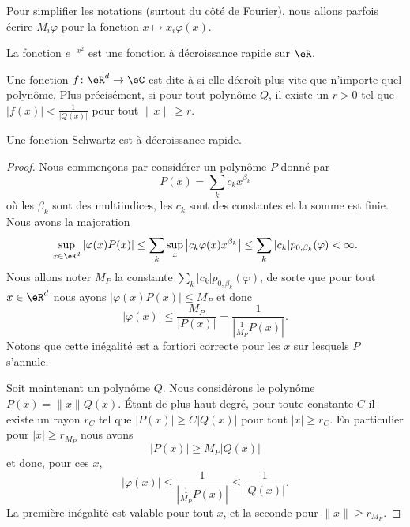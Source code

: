 Pour simplifier les notations (surtout du côté de Fourier), nous allons parfois écrire \( M_i\varphi\) pour la fonction \( x\mapsto x_i\varphi(x)\).

\begin{example}
    La fonction \(  e^{-x^2}\) est une fonction à décroissance rapide sur \( \eR\).
\end{example}

\begin{definition}
    Une fonction \( f\colon \eR^d\to \eC\) est dite à  si elle décroît plus vite que n'importe quel polynôme. Plus précisément, si pour tout polynôme \( Q\), il existe un \( r>0\) tel que \(  | f(x) |<\frac{1}{ | Q(x) | } \) pour tout \( \| x \|\geq r\).
\end{definition}

\begin{proposition} \label{PropCSmzwGv}
    Une fonction Schwartz est à décroissance rapide.
\end{proposition}

\begin{proof}
    Nous commençons par considérer un polynôme \( P\) donné par
    \begin{equation}
        P(x)=\sum_kc_kx^{\beta_k}
    \end{equation}
    où les \( \beta_k\) sont des multiindices, les \( c_k\) sont des constantes et la somme est finie. Nous avons la majoration
    \begin{equation}
        \sup_{x\in \eR^d}| \varphi(x)P(x) |\leq\sum_k\sup_x\big| c_k\varphi(x) x^{\beta_k} \big|\leq\sum_k| c_k |p_{0,\beta_k}(\varphi)<\infty.
    \end{equation}
    Nous allons noter \( M_P\) la constante \( \sum_k| c_k |p_{0,\beta_k}(\varphi)\), de sorte que pour tout \( x\in \eR^d\) nous ayons \( | \varphi(x)P(x) |\leq M_P\) et donc
    \begin{equation}
        | \varphi(x) |\leq \frac{ M_P }{ | P(x) | }=\frac{1}{ | \frac{1}{ M_P }P(x) | }.
    \end{equation}
    Notons que cette inégalité est a fortiori correcte pour les \( x\) sur lesquels \( P\) s'annule.

    Soit maintenant un polynôme \( Q\). Nous considérons le polynôme \( P(x)=\| x \|Q(x)\). Étant de plus haut degré, pour toute constante \( C\) il existe un rayon \( r_C\) tel que \( | P(x) |\geq C| Q(x) |\) pour tout \( | x |\geq r_C\). En particulier pour \( | x |\geq r_{M_P}\) nous avons
    \begin{equation}
        | P(x) |\geq M_P| Q(x) |
    \end{equation}
    et donc, pour ces \( x\),
    \begin{equation}
        | \varphi(x) |\leq \frac{1}{ | \frac{1}{ M_P }P(x) | }\leq \frac{1}{ | Q(x) | }.
    \end{equation}
    La première inégalité est valable pour tout \( x\), et la seconde pour \( \| x \|\geq r_{M_P}\).
\end{proof}

